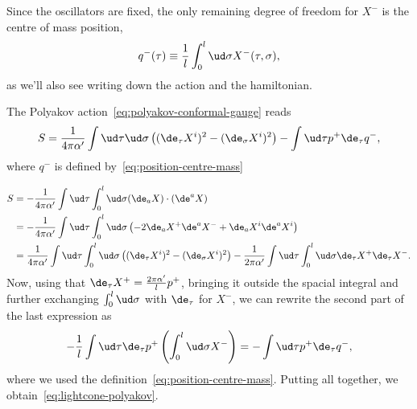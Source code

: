 Since the oscillators are fixed, the only remaining degree of freedom for $X^-$ is the centre of mass position,
\begin{equation}\label{eq:position-centre-mass}
   q^-(\tau) \equiv \frac{1}{l} \int_0^l \ud \sigma X^-(\tau, \sigma) ,
\end{equation}
as we'll also see writing down the action and the hamiltonian.

The Polyakov action~\eqref{eq:polyakov-conformal-gauge} reads
\begin{equation}\label{eq:lightcone-polyakov}
    S = \frac{1}{4\pi\alpha'} \int \ud \tau \ud \sigma \left( (\de_\tau X^i)^2 - (\de_\sigma X^i)^2 \right) - \int \ud \tau p^+ \de_\tau q^-,
\end{equation}
where $q^-$ is defined by~\eqref{eq:position-centre-mass}

\begin{mdframed}
\begin{innerproof}
    \begin{equation*}
    \begin{split}
        S &= -\frac{1}{4\pi\alpha'} \int \ud \tau \int_0^l \ud \sigma (\de_a X) \cdot (\de^a X) \\
        &= - \frac{1}{4\pi\alpha'} \int \ud \tau \int_0^l \ud \sigma \left( -2 \de_a X^+ \de^a X^- + \de_a X^i \de^a X^i \right) \\
        &= \frac{1}{4\pi\alpha'} \int \ud \tau \int_0^l \ud \sigma \left( (\de_\tau X^i)^2 - (\de_\sigma X^i)^2 \right) - \frac{1}{2\pi\alpha'} \int \ud \tau \int_0^l \ud \sigma \de_\tau X^+ \de_\tau X^- .
    \end{split}
    \end{equation*}
    Now, using that $\de_\tau X^+ = \frac{2\pi\alpha'}{l} p^+$, bringing it outside the spacial integral and further exchanging $\int_0^l \ud \sigma$ with $\de_\tau$ for $X^-$, we can rewrite the second part of the last expression as
    \begin{equation*}
        -\frac{1}{l} \int \ud \tau \de_\tau p^+ \left( \int_0^l \ud \sigma X^- \right) = - \int \ud \tau p^+ \de_\tau q^-,
    \end{equation*}
    where we used the definition~\eqref{eq:position-centre-mass}. Putting all together, we obtain~\eqref{eq:lightcone-polyakov}.
\end{innerproof}
\end{mdframed}

